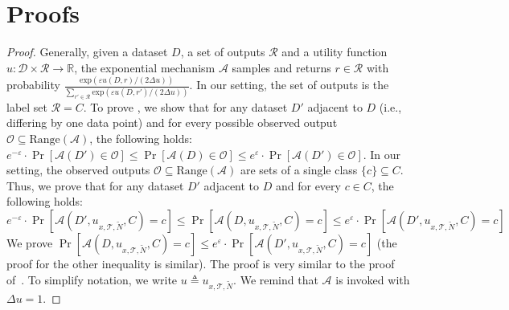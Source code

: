 \appendix

\section{Proofs}\label{sec:proofs}
\ftb*
\begin{proof}
Generally, given a dataset $D$, a set of outputs $\mathcal{R}$ and a utility function $u:\mathcal{D} \times \mathcal{R} \rightarrow \mathbb{R}$,
the exponential mechanism $\mathcal{A}$ samples and returns $r\in \mathcal{R}$ with probability $\frac{\text{exp}(\varepsilon u(D,r)/(2\Delta u))}{\sum_{r'\in \mathcal{R}} \text{exp}(\varepsilon u(D,r')/(2\Delta u))}$.
In our setting, the set of outputs is the label set $\mathcal{R}=C$.
To prove \propi, we show that for any dataset $D'$ adjacent to $D$ (i.e., differing by one data point) and for every possible observed output $\mathcal{O} \subseteq \text{Range}(\mathcal{A})$, the following holds:
$e^{-\varepsilon} \cdot \Pr[\mathcal{A}(D') \in \mathcal{O}] \leq\Pr[\mathcal{A}(D) \in \mathcal{O}] \leq e^{\varepsilon} \cdot \Pr[\mathcal{A}(D') \in \mathcal{O}]$.
In our setting, the observed outputs $\mathcal{O} \subseteq \text{Range}(\mathcal{A})$ are sets of a single class $\{c\}\subseteq C$.
 Thus, we prove that for any dataset $D'$ adjacent to $D$ and for every $c \in C$, the following holds:  
 $$e^{-\varepsilon} \cdot \Pr[\mathcal{A}(D',u_{x,\mathcal{T},\widetilde{N}},C) =c] \leq\Pr[\mathcal{A}(D,u_{x,\mathcal{T},\widetilde{N}},C) =c] \leq e^{\varepsilon} \cdot \Pr[\mathcal{A}(D',u_{x,\mathcal{T},\widetilde{N}},C) =c]$$ 
We prove $\Pr[\mathcal{A}(D,u_{x,\mathcal{T},\widetilde{N}},C) =c] \leq e^{\varepsilon} \cdot \Pr[\mathcal{A}(D',u_{x,\mathcal{T},\widetilde{N}},C) =c]$ (the proof for the other inequality is similar).
The proof is very similar to the proof of~\cite[Theorem 3.10]{ref_87}.
To simplify notation, we write $u\triangleq u_{x,\mathcal{T},\widetilde{N}}$. 
We remind that $\mathcal{A}$ is invoked with $\Delta u=1$.



\end{proof}
